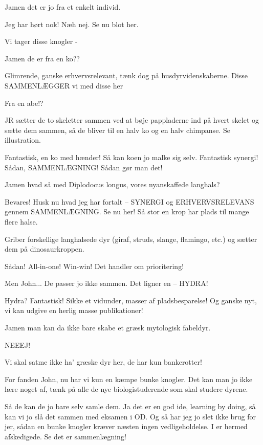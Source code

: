 \documentclass[a4paper,11pt]{article}
\begin{document}
\begin{sketch}
 Jamen det er jo fra et enkelt individ.

 Jeg har hørt nok! Næh nej. Se nu blot her. 

 Vi tager disse knogler - 

 Jamen de er fra en ko??

 Glimrende, ganske erhvervsrelevant, tænk dog på husdyrvidenskaberne. Disse SAMMENLÆGGER vi med disse her 

 Fra en abe!?

\scene JR sætter de to skeletter sammen ved at bøje pappladerne ind på hvert skelet og sætte dem sammen, så de bliver til en halv ko og en halv chimpanse. Se illustration.


 Fantastisk, en ko med hænder! Så kan koen jo malke sig selv. Fantastisk synergi! Sådan, SAMMENLÆGNING! Sådan gør man det!

 Jamen hvad så med Diplodocus longus, vores nyanskaffede langhals?

 Bevares! Husk nu hvad jeg har fortalt – SYNERGI og ERHVERVSRELEVANS gennem SAMMENLÆGNING. Se nu her! Så stor en krop har plads til mange flere halse.

Griber forskellige langhalsede dyr (giraf, struds, slange, flamingo, etc.) og sætter dem på dinosaurkroppen.

 Sådan! All-in-one! Win-win! Det handler om prioritering!

 Men John... De passer jo ikke sammen. Det ligner en – HYDRA!

 Hydra? Fantastisk! Sikke et vidunder, masser af pladsbesparelse! Og ganske nyt, vi kan udgive en herlig masse publikationer!

 Jamen man kan da ikke bare skabe et græsk mytologisk fabeldyr.

 NEEEJ! 

 Vi skal satme ikke ha' græske dyr her, de har kun bankerotter!

 For fanden John, nu har vi kun en kæmpe bunke knogler. Det kan man jo ikke lære noget af, tænk på alle de nye biologistuderende som skal studere dyrene.

 Så de kan de jo bare selv samle dem. Ja det er en god ide, learning by doing, så kan vi jo slå det sammen med eksamen i OD. Og så har jeg jo slet ikke brug for jer, sådan en bunke knogler kræver næsten ingen vedligeholdelse. I er hermed afskedigede. Se det er sammenlægning!


\end{sketch}
\end{document}
